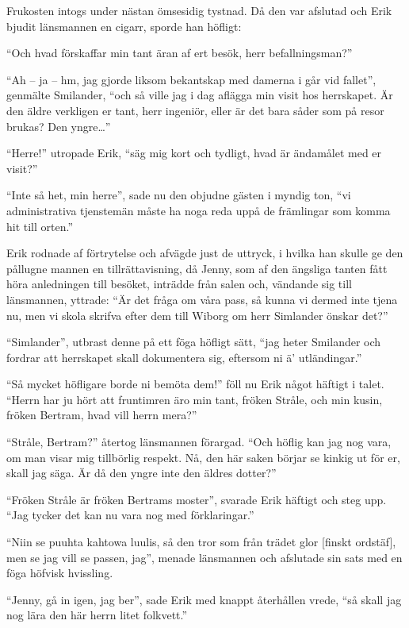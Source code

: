Frukosten intogs under nästan ömsesidig tystnad. Då den var afslutad och
Erik bjudit länsmannen en cigarr, sporde han höfligt:

``Och hvad förskaffar min tant äran af ert besök, herr befallningsman?''

``Ah -- ja -- hm, jag gjorde liksom bekantskap med damerna i går vid
fallet'', genmälte Smilander, ``och så ville jag i dag aflägga min visit
hos herrskapet. Är den äldre verkligen er tant, herr ingeniör, eller är
det bara såder som på resor brukas? Den yngre\ldots{}''

``Herre!'' utropade Erik, ``säg mig kort och tydligt, hvad är ändamålet
med er visit?''

``Inte så het, min herre'', sade nu den objudne gästen i myndig ton,
``vi administrativa tjenstemän måste ha noga reda uppå de främlingar som
komma hit till orten.''

Erik rodnade af förtrytelse och afvägde just de uttryck, i hvilka han
skulle ge den pållugne mannen en tillrättavisning, då Jenny, som af den
ängsliga tanten fått höra anledningen till besöket, inträdde från salen
och, vändande sig till länsmannen, yttrade: ``Är det fråga om våra pass,
så kunna vi dermed inte tjena nu, men vi skola skrifva efter dem till
Wiborg om herr Simlander önskar det?''

``Simlander'', utbrast denne på ett föga höfligt sätt, ``jag heter
Smilander och fordrar att herrskapet skall dokumentera sig, eftersom ni
ä' utländingar.''

``Så mycket höfligare borde ni bemöta dem!'' föll nu Erik något häftigt
i talet. ``Herrn har ju hört att fruntimren äro min tant, fröken Stråle,
och min kusin, fröken Bertram, hvad vill herrn mera?''

``Stråle, Bertram?'' återtog länsmannen förargad. ``Och höflig kan jag
nog vara, om man visar mig tillbörlig respekt. Nå, den här saken börjar
se kinkig ut för er, skall jag säga. Är då den yngre inte den äldres
dotter?''

``Fröken Stråle är fröken Bertrams moster'', svarade Erik häftigt och
steg upp. ``Jag tycker det kan nu vara nog med förklaringar.''

``Niin se puuhta kahtowa luulis, så den tror som från trädet glor
{[}finskt ordstäf{]}, men se jag vill se passen, jag'', menade
länsmannen och afslutade sin sats med en föga höfvisk hvissling.

``Jenny, gå in igen, jag ber'', sade Erik med knappt återhållen vrede,
``så skall jag nog lära den här herrn litet folkvett.''


